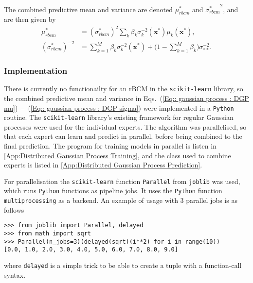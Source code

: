 \documentclass[twoside,english]{uiofysmaster}
\begin{document}
{The combined predictive mean and variance are denoted $\mu_{rbcm}^*$ and ${\sigma^*_{rbcm}}^2$, and are then given by
\begin{align}
\mu^*_{rbcm} &= (\sigma^*_{rbcm})^2 \sum_k \beta_k \sigma_k^{-2} (\textbf{x}^*) \mu_k (\textbf{x}^*),\label{Eq:: gaussian process : DGP mu} \\
(\sigma^*_{rbcm})^{-2} &= \sum_{k=1}^M \beta_k \sigma_k^{-2} (\textbf{x}^*) + \big(1 - \sum_{k=1}^M \beta_k \big) \sigma_{**}^{-2}.\label{Eq:: gaussian process : DGP sigma}
\end{align}


\subsubsection{Implementation}

There is currently no functionailty for an rBCM in the \verb|scikit-learn| library, so the combined predictive mean and variance in Eqs.~(\ref{Eq:: gaussian process : DGP mu})~--~(\ref{Eq:: gaussian process : DGP sigma}) were implemented in a \verb|Python| routine. The \verb|scikit-learn| library's existing framework for regular Gaussian processes were used for the individual experts. The algorithm was parallelised, so that each expert can learn and predict in parallel, before being combined to the final prediction. The program for training models in parallel is listen in \autoref{App:Distributed Gaussian Process Training}, and the class used to combine experts is listed in \autoref{App:Distributed Gaussian Process Prediction}.  


For parallelisation the \verb|scikit-learn| function \verb|Parallel| from \verb|joblib| was used, which runs \verb|Python| functions as pipeline jobs. It uses the \verb|Python| function \verb|multiprocessing| as a backend. An example of usage with 3 parallel jobs is as follows
\begin{lstlisting}
>>> from joblib import Parallel, delayed
>>> from math import sqrt
>>> Parallel(n_jobs=3)(delayed(sqrt)(i**2) for i in range(10))
[0.0, 1.0, 2.0, 3.0, 4.0, 5.0, 6.0, 7.0, 8.0, 9.0]
\end{lstlisting}
where \verb|delayed| is a simple trick to be able to create a tuple with a function-call syntax.


}
\end{document}
